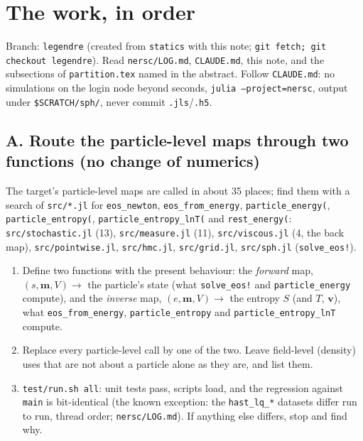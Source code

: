 \documentclass[11pt,aps,preprint,nofootinbib,superscriptaddress,tightenlines]{revtex4-2}
\begin{document}
\section{The work, in order}
\label{sec:work}

Branch: \texttt{legendre} (created from \texttt{statics} with this note; \texttt{git fetch; git checkout legendre}).  Read \nolinkurl{nersc/LOG.md}, \nolinkurl{CLAUDE.md}, this note, and the subsections of
\nolinkurl{partition.tex} named in the abstract.  Follow \nolinkurl{CLAUDE.md}: no simulations on the login node beyond seconds, \texttt{julia --project=nersc},
output under \texttt{\$SCRATCH/sph/}, never commit \texttt{.jls}/\texttt{.h5}.

\subsection{A. Route the particle-level maps through two functions (no change of numerics)}
\label{sec:routing}

The target's particle-level maps are called in about 35 places; find them with a search of \texttt{src/*.jl} for \texttt{eos\_newton}, \texttt{eos\_from\_energy},
\texttt{particle\_energy(}, \texttt{particle\_entropy(}, \texttt{particle\_entropy\_lnT(} and \texttt{rest\_energy(}:
\nolinkurl{src/stochastic.jl} (13), \nolinkurl{src/measure.jl} (11), \nolinkurl{src/viscous.jl} (4, the back map), \nolinkurl{src/pointwise.jl},
\nolinkurl{src/hmc.jl}, \nolinkurl{src/grid.jl}, \nolinkurl{src/sph.jl} (\texttt{solve\_eos!}).
\begin{enumerate}
\item Define two functions with the present behaviour: the \emph{forward} map, $(s,\bm m,V)\to$ the particle's state (what \texttt{solve\_eos!} and
  \texttt{particle\_energy} compute), and the \emph{inverse} map, $(e,\bm m,V)\to$ the entropy $S$ (and $T$, $\bm v$), what \texttt{eos\_from\_energy},
  \texttt{particle\_entropy} and \texttt{particle\_entropy\_lnT} compute.
\item Replace every particle-level call by one of the two.  Leave field-level (density) uses that are not about a particle alone as they are, and list them.
\item \texttt{test/run.sh all}: unit tests pass, scripts load, and the regression against \texttt{main} is bit-identical (the known exception: the
  \texttt{hast\_lq\_*} datasets differ run to run, thread order; \nolinkurl{nersc/LOG.md}).  If anything else differs, stop and find why.
\end{enumerate}
\end{document}
